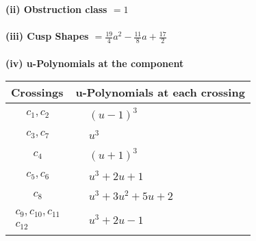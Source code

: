 \documentclass[1p]{elsarticle_modified}
\theoremstyle{definition}
\begin{document}
\flushleft \textbf{(ii) Obstruction class $= 1$}\\~\\
\flushleft \textbf{(iii) Cusp Shapes $= \frac{19}{4} a^2-\frac{11}{8} a+\frac{17}{2}$}\\~\\
\newpage\renewcommand{\arraystretch}{1}
\flushleft \textbf{(iv) u-Polynomials at the component}\newline \\
\begin{tabular}{m{50pt}|m{274pt}}
Crossings & \hspace{64pt}u-Polynomials at each crossing \\
\hline $$\begin{aligned}c_{1},c_{2}\end{aligned}$$&$\begin{aligned}
&(u-1)^3
\end{aligned}$\\
\hline $$\begin{aligned}c_{3},c_{7}\end{aligned}$$&$\begin{aligned}
&u^3
\end{aligned}$\\
\hline $$\begin{aligned}c_{4}\end{aligned}$$&$\begin{aligned}
&(u+1)^3
\end{aligned}$\\
\hline $$\begin{aligned}c_{5},c_{6}\end{aligned}$$&$\begin{aligned}
&u^3+2 u+1
\end{aligned}$\\
\hline $$\begin{aligned}c_{8}\end{aligned}$$&$\begin{aligned}
&u^3+3 u^2+5 u+2
\end{aligned}$\\
\hline $$\begin{aligned}c_{9},c_{10},c_{11}\\c_{12}\end{aligned}$$&$\begin{aligned}
&u^3+2 u-1
\end{aligned}$\\
\hline
\end{tabular}\\~\\
\end{document}
